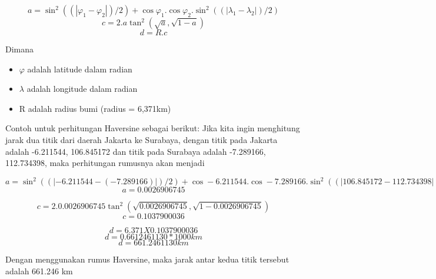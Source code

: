 \begin{displaymath}
	a = \sin^{2}((|\varphi_{1}-\varphi_{2}|)/2) + \cos\varphi_{1} . \cos\varphi_{2} . \sin^{2}((|\lambda_{1}-\lambda_{2}|)/2)
\end{displaymath}
\begin{displaymath}
	c = 2 . a\tan^{2}(\sqrt{a}, \sqrt{1-a})
\end{displaymath}
\begin{displaymath}
	d = R . c
\end{displaymath}

Dimana 
\begin{itemize}
	\item $\varphi$ adalah latitude dalam radian
	\item $\lambda$ adalah longitude dalam radian
	\item R adalah radius bumi (radius = 6,371km)
\end{itemize}

Contoh untuk perhitungan Haversine sebagai berikut:
Jika kita ingin menghitung jarak dua titik dari daerah Jakarta ke Surabaya, dengan titik pada Jakarta adalah -6.211544, 106.845172 dan titik pada Surabaya adalah -7.289166, 112.734398, maka perhitungan rumusnya akan menjadi

\begin{displaymath}
	a = \sin^{2}((|-6.211544-(-7.289166)|)/2) + \cos-6.211544 . \cos-7.289166 . \sin^{2}((|106.845172-112.734398|)/2)
\end{displaymath}
\begin{displaymath}
	a = 0.0026906745
\end{displaymath}

\begin{displaymath}
	c = 2 . 0.0026906745\tan^{2}(\sqrt{0.0026906745}, \sqrt{1-0.0026906745})
\end{displaymath}
\begin{displaymath}
	c =  0.1037900036
\end{displaymath}

\begin{displaymath}
	d = 6.371 X 0.1037900036
\end{displaymath}
\begin{displaymath}
	d = 0.6612461130 * 1000 km
\end{displaymath}
\begin{displaymath}
	d = 661.2461130 km
\end{displaymath}

Dengan menggunakan rumus Haversine, maka jarak antar kedua titik tersebut adalah 661.246 km
